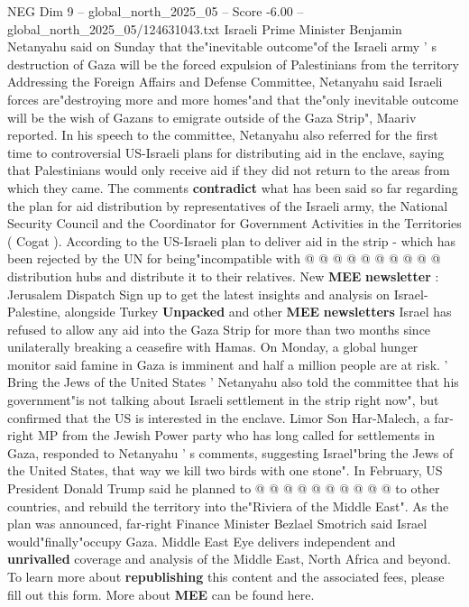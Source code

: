 \begin{textsample}{NEG Dim 9 – global\_north\_2025\_05 – Score -6.00 – global\_north\_2025\_05/124631043.txt}  \label{ex:f9_neg_093}
Israeli Prime Minister Benjamin Netanyahu said on Sunday that the"inevitable outcome"of the Israeli army ' s destruction of Gaza will be the forced expulsion of Palestinians from the territory Addressing the Foreign Affairs and Defense Committee, Netanyahu said Israeli forces are"destroying more and more homes"and that the"only inevitable outcome will be the wish of Gazans to emigrate outside of the Gaza Strip", Maariv reported.
In his speech to the committee, Netanyahu also referred for the first time to controversial US-Israeli plans for distributing aid in the enclave, saying that Palestinians would only receive aid if they did not return to the areas from which they came.
The comments \textbf{contradict} what has been said so far regarding the plan for aid distribution by representatives of the Israeli army, the National Security Council and the Coordinator for Government Activities in the Territories ( Cogat ).
According to the US-Israeli plan to deliver aid in the strip - which has been rejected by the UN for being"incompatible with @ @ @ @ @ @ @ @ @ @ distribution hubs and distribute it to their relatives.
New \textbf{MEE} \textbf{newsletter} : Jerusalem Dispatch Sign up to get the latest insights and analysis on Israel-Palestine, alongside Turkey \textbf{Unpacked} and other \textbf{MEE} \textbf{newsletters} Israel has refused to allow any aid into the Gaza Strip for more than two months since unilaterally breaking a ceasefire with Hamas.
On Monday, a global hunger monitor said famine in Gaza is imminent and half a million people are at risk. ' Bring the Jews of the United States ' Netanyahu also told the committee that his government"is not talking about Israeli settlement in the strip right now", but confirmed that the US is interested in the enclave.
Limor Son Har-Malech, a far-right MP from the Jewish Power party who has long called for settlements in Gaza, responded to Netanyahu ' s comments, suggesting Israel"bring the Jews of the United States, that way we kill two birds with one stone".
In February, US President Donald Trump said he planned to @ @ @ @ @ @ @ @ @ @ to other countries, and rebuild the territory into the"Riviera of the Middle East".
As the plan was announced, far-right Finance Minister Bezlael Smotrich said Israel would"finally"occupy Gaza.
Middle East Eye delivers independent and \textbf{unrivalled} coverage and analysis of the Middle East, North Africa and beyond.
To learn more about \textbf{republishing} this content and the associated fees, please fill out this form.
More about \textbf{MEE} can be found here.

\end{textsample}
